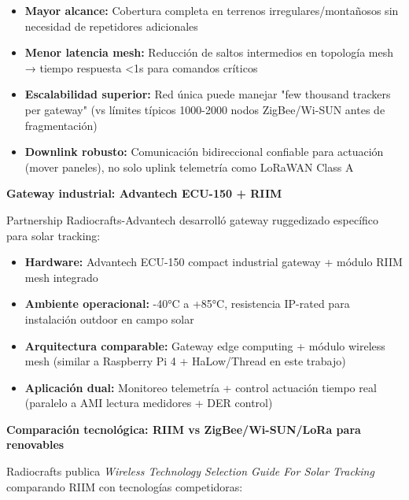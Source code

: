 \begin{itemize}
    \item \textbf{Mayor alcance:} Cobertura completa en terrenos irregulares/montañosos sin necesidad de repetidores adicionales
    \item \textbf{Menor latencia mesh:} Reducción de saltos intermedios en topología mesh → tiempo respuesta <1s para comandos críticos
    \item \textbf{Escalabilidad superior:} Red única puede manejar "few thousand trackers per gateway" (vs límites típicos 1000-2000 nodos ZigBee/Wi-SUN antes de fragmentación)
    \item \textbf{Downlink robusto:} Comunicación bidireccional confiable para actuación (mover paneles), no solo uplink telemetría como LoRaWAN Class A
\end{itemize}

\textbf{Gateway industrial: Advantech ECU-150 + RIIM}

Partnership Radiocrafts-Advantech desarrolló gateway ruggedizado específico para solar tracking:
\begin{itemize}
    \item \textbf{Hardware:} Advantech ECU-150 compact industrial gateway + módulo RIIM mesh integrado
    \item \textbf{Ambiente operacional:} -40°C a +85°C, resistencia IP-rated para instalación outdoor en campo solar
    \item \textbf{Arquitectura comparable:} Gateway edge computing + módulo wireless mesh (similar a Raspberry Pi 4 + HaLow/Thread en este trabajo)
    \item \textbf{Aplicación dual:} Monitoreo telemetría + control actuación tiempo real (paralelo a AMI lectura medidores + DER control)
\end{itemize}

\textbf{Comparación tecnológica: RIIM vs ZigBee/Wi-SUN/LoRa para renovables}

Radiocrafts publica \textit{Wireless Technology Selection Guide For Solar Tracking} comparando RIIM con tecnologías competidoras:

